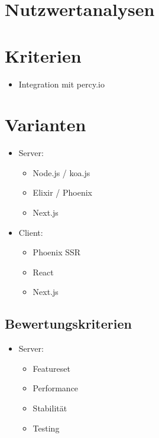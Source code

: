 \section{Nutzwertanalysen}\label{nutzwertanalysen}

\section{Kriterien}\label{kriterien}

\begin{itemize}
\tightlist
\item
  Integration mit percy.io
\end{itemize}

\section{Varianten}\label{varianten}

\begin{itemize}
\tightlist
\item
  Server:
  \begin{itemize}
  \tightlist
  \item
    Node.js / koa.js
  \item
    Elixir / Phoenix
  \item
    Next.js
  \end{itemize}
\end{itemize}

\begin{itemize}
\tightlist
\item
  Client:
  \begin{itemize}
  \tightlist
  \item
    Phoenix SSR
  \item
    React
  \item
    Next.js
  \end{itemize}
\end{itemize}

\subsection{Bewertungskriterien}\label{bewertungskriterien}

\begin{itemize}
\tightlist
\item
  Server:
  \begin{itemize}
  \tightlist
  \item
    Featureset
  \item
    Performance
  \item
    Stabilität
  \item
    Testing
  \end{itemize}
\end{itemize}

